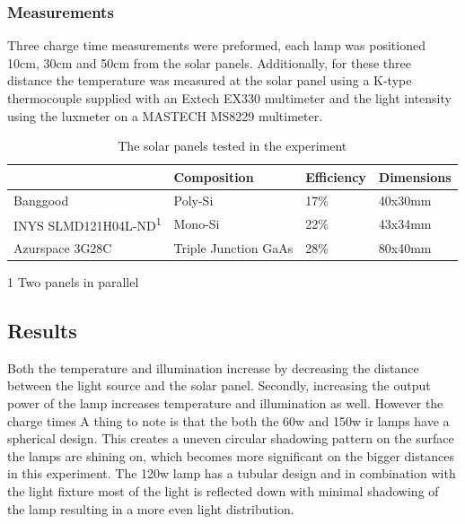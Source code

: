 \subsubsection{Measurements}
Three charge time measurements were preformed, each lamp was positioned 10cm, 30cm and 50cm from the solar panels.
Additionally, for these three distance the temperature was measured at the solar panel using a K-type thermocouple supplied with an Extech EX330 multimeter and the light intensity using the luxmeter on a MASTECH MS8229 multimeter.

\begin{table}[t]
	\centering
	\begin{threeparttable}
		\caption{The solar panels tested in the experiment}
		\label{tab:solar_panels}
		\small
		\begin{tabular}{|l|l|l|l|}
			\hline
			& Composition & Efficiency & Dimensions \\
			\hline \hline
			Banggood \cite{bangood_solar_2017}& Poly-Si & 17\% & 40x30mm \\
			\hline
			INYS SLMD121H04L-ND\textsuperscript{1}& Mono-Si & 22\% & 43x34mm \\
			\hline
			Azurspace 3G28C & Triple Junction GaAs& 28\% & 80x40mm \\
			\hline
		\end{tabular}
	\begin{tablenotes}
		\small
		\item [1] Two panels in parallel
	\end{tablenotes}
	\end{threeparttable}
\end{table}

\subsection{Results}

Both the temperature and illumination increase by decreasing the distance between the light source and the solar panel. 
Secondly, increasing the output power of the lamp increases temperature and illumination as well. 
However the charge times 
A thing to note is that the both the 60w and 150w ir lamps have a spherical design. This creates a uneven circular shadowing pattern on the surface the lamps are shining on, which becomes more significant on the bigger distances in this experiment.
The 120w lamp has a tubular design and in combination with the light fixture most of the light is reflected down with minimal shadowing of the lamp resulting in a more even light distribution.

